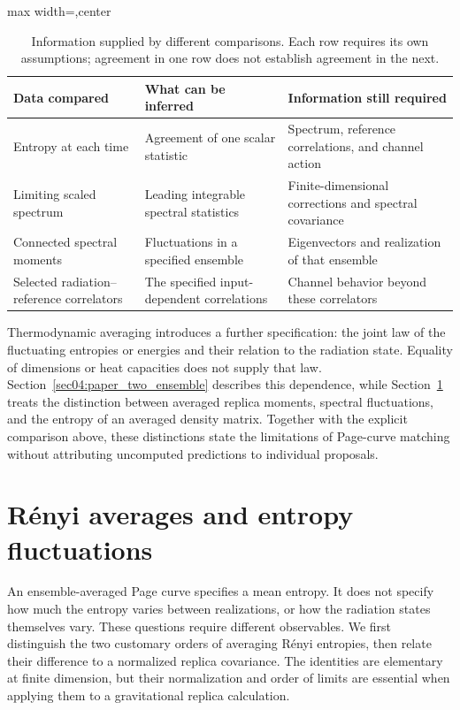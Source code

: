 \documentclass[11pt,letterpaper]{article}
\theoremstyle{plain}
\theoremstyle{definition}
\theoremstyle{remark}
\begin{document}
\begin{table}[htbp]
\centering
\caption{Information supplied by different comparisons.  Each row
requires its own assumptions; agreement in one row does not establish
agreement in the next.}
\label{tab05:hierarchy_summary}
\begin{adjustbox}{max width=\textwidth,center}
\begin{tabular}{p{}p{}p{}}
\toprule
Data compared & What can be inferred & Information still required\\
\midrule
Entropy at each time & Agreement of one scalar statistic & Spectrum,
reference correlations, and channel action\\
Limiting scaled spectrum & Leading integrable spectral statistics &
Finite-dimensional corrections and spectral covariance\\
Connected spectral moments & Fluctuations in a specified ensemble &
Eigenvectors and realization of that ensemble\\
Selected radiation--reference correlators & The specified input-dependent
correlations & Channel behavior beyond these correlators\\
\bottomrule
\end{tabular}
\end{adjustbox}
\end{table}

Thermodynamic averaging introduces a further specification: the joint
law of the fluctuating entropies or energies and their relation to the
radiation state.  Equality of dimensions or heat capacities does not
supply that law.  Section~\ref{sec04:paper_two_ensemble} describes
this dependence, while Section~\ref{sec06:annealed_quenched} treats
the distinction between averaged replica moments, spectral fluctuations,
and the entropy of an averaged density matrix.  Together with the
explicit comparison above, these distinctions state the limitations
of Page-curve matching without attributing uncomputed predictions to
individual proposals.

\section{R\'enyi averages and entropy fluctuations}
\label{sec06:annealed_quenched}

An ensemble-averaged Page curve specifies a mean entropy.  It does not
specify how much the entropy varies between realizations, or how the
radiation states themselves vary.  These questions require different
observables.  We first distinguish the two customary orders of averaging
R\'enyi entropies, then relate their difference to a normalized replica
covariance.  The identities are elementary at finite dimension, but their
normalization and order of limits are essential when applying them to a
gravitational replica calculation.
\end{document}

